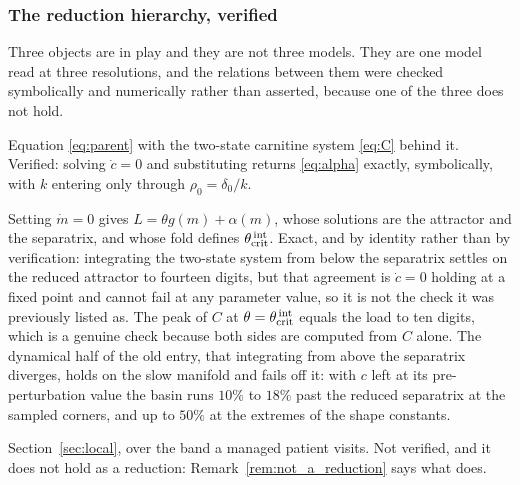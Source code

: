 \subsubsection{The reduction hierarchy, verified}
\label{sec:hierarchy}

Three objects are in play and they are not three models. They are one model read at three
resolutions, and the relations between them were checked symbolically and numerically
rather than asserted, because one of the three does not hold.

\begin{description}[leftmargin=1.6em, itemsep=3pt]
\item[The dynamic model.] Equation \eqref{eq:parent} with the two-state carnitine system
\eqref{eq:C} behind it. Verified: solving $\dot c = 0$ and substituting returns
\eqref{eq:alpha} exactly, symbolically, with $k$ entering only through $\rho_0 = \delta_0/k$.
\item[The equilibrium reduction.] Setting $\dot m = 0$ gives $L = \theta g(m) + \alpha(m)$,
whose solutions are the attractor and the separatrix, and whose fold defines
$\theta_{\mathrm{crit}}^{\,\mathrm{int}}$. Exact, and by identity rather than by verification: integrating the
two-state system from below the separatrix settles on the reduced attractor to fourteen
digits, but that agreement is $\dot c = 0$ holding at a fixed point and cannot fail at any
parameter value, so it is not the check it was previously listed as. The peak of $C$ at
$\theta = \theta_{\mathrm{crit}}^{\,\mathrm{int}}$ equals the load to ten digits, which is a genuine check
because both sides are computed from $C$ alone. The dynamical half of the old entry, that
integrating from above the separatrix diverges, holds on the slow manifold and fails off it:
with $c$ left at its pre-perturbation value the basin runs $10\%$ to $18\%$ past the reduced
separatrix at the sampled corners, and up to $50\%$ at the extremes of the shape constants.
\item[The local identification model.] Section~\ref{sec:local}, over the band a managed
patient visits. Not verified, and it does not hold as a reduction:
Remark~\ref{rem:not_a_reduction} says what does.
\end{description}

